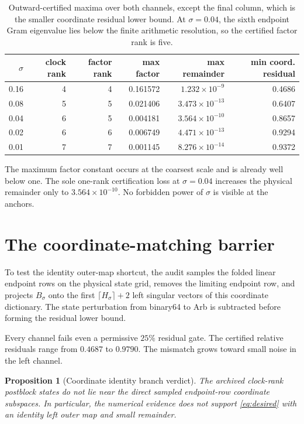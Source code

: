 \documentclass[11pt]{article}
\newtheorem{proposition}[theorem]{Proposition}
\theoremstyle{remark}
\begin{document}
\begin{table}[ht]
\centering
\small
\begin{tabular}{rrrrrr}
\toprule
$\sigma$ & clock rank & factor rank & max factor & max remainder & min coord. residual\\
\midrule
0.16 & 4 & 4 & 0.161572 & $1.232\times10^{-9}$ & 0.4686\\
0.08 & 5 & 5 & 0.021406 & $3.473\times10^{-13}$ & 0.6407\\
0.04 & 6 & 5 & 0.004181 & $3.564\times10^{-10}$ & 0.8657\\
0.02 & 6 & 6 & 0.006749 & $4.471\times10^{-13}$ & 0.9294\\
0.01 & 7 & 7 & 0.001145 & $8.276\times10^{-14}$ & 0.9372\\
\bottomrule
\end{tabular}
\caption{Outward-certified maxima over both channels, except the final column,
which is the smaller coordinate residual lower bound.  At $\sigma=0.04$, the
sixth endpoint Gram eigenvalue lies below the finite arithmetic resolution, so
the certified factor rank is five.}
\label{tab:factor}
\end{table}

The maximum factor constant occurs at the coarsest scale and is already well
below one.  The sole one-rank certification loss at $\sigma=0.04$ increases
the physical remainder only to $3.564\times10^{-10}$.  No forbidden power of
$\sigma$ is visible at the anchors.

\section{The coordinate-matching barrier}

To test the identity outer-map shortcut, the audit samples the folded linear
endpoint rows on the physical state grid, removes the limiting endpoint row,
and projects $B_\sigma$ onto the first
$\lceil H_\sigma\rceil+2$ left singular vectors of this coordinate
dictionary.  The state perturbation from binary64 to Arb is subtracted before
forming the residual lower bound.

Every channel fails even a permissive $25\%$ residual gate.  The certified
relative residuals range from $0.4687$ to $0.9790$.  The mismatch grows toward
small noise in the left channel.

\begin{proposition}[Coordinate identity branch verdict]
\label{prop:coordinate}
The archived clock-rank postblock states do not lie near the direct sampled
endpoint-row coordinate subspaces.  In particular, the numerical evidence
does not support \eqref{eq:desired} with an identity left outer map and small
remainder.
\end{proposition}
\end{document}
